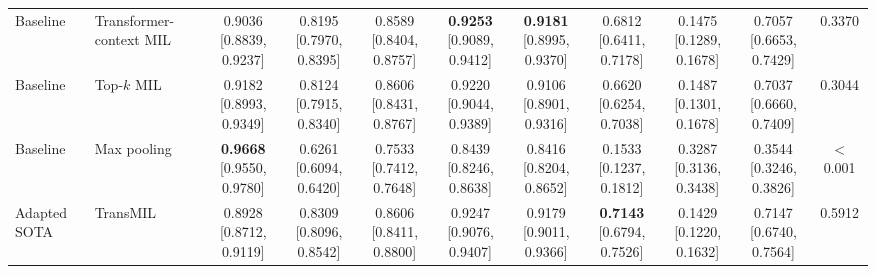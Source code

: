 \documentclass[Afour,sagev,times]{sagej}
\begin{document}
\begin{table}[t]
{\begin{tabular}{ll*{9}{c}}
Baseline & Transformer-context MIL & \shortstack{0.9036\\{[}0.8839, 0.9237{]}} & \shortstack{0.8195\\{[}0.7970, 0.8395{]}} & \shortstack{0.8589\\{[}0.8404, 0.8757{]}} & \shortstack{\textbf{0.9253}\\{[}0.9089, 0.9412{]}} & \shortstack{\textbf{0.9181}\\{[}0.8995, 0.9370{]}} & \shortstack{0.6812\\{[}0.6411, 0.7178{]}} & \shortstack{0.1475\\{[}0.1289, 0.1678{]}} & \shortstack{0.7057\\{[}0.6653, 0.7429{]}} & 0.3370 \\
Baseline & Top-$k$ MIL & \shortstack{0.9182\\{[}0.8993, 0.9349{]}} & \shortstack{0.8124\\{[}0.7915, 0.8340{]}} & \shortstack{0.8606\\{[}0.8431, 0.8767{]}} & \shortstack{0.9220\\{[}0.9044, 0.9389{]}} & \shortstack{0.9106\\{[}0.8901, 0.9316{]}} & \shortstack{0.6620\\{[}0.6254, 0.7038{]}} & \shortstack{0.1487\\{[}0.1301, 0.1678{]}} & \shortstack{0.7037\\{[}0.6660, 0.7409{]}} & 0.3044 \\
Baseline & Max pooling & \shortstack{\textbf{0.9668}\\{[}0.9550, 0.9780{]}} & \shortstack{0.6261\\{[}0.6094, 0.6420{]}} & \shortstack{0.7533\\{[}0.7412, 0.7648{]}} & \shortstack{0.8439\\{[}0.8246, 0.8638{]}} & \shortstack{0.8416\\{[}0.8204, 0.8652{]}} & \shortstack{0.1533\\{[}0.1237, 0.1812{]}} & \shortstack{0.3287\\{[}0.3136, 0.3438{]}} & \shortstack{0.3544\\{[}0.3246, 0.3826{]}} & $<$0.001 \\
\midrule
Adapted SOTA & TransMIL & \shortstack{0.8928\\{[}0.8712, 0.9119{]}} & \shortstack{0.8309\\{[}0.8096, 0.8542{]}} & \shortstack{0.8606\\{[}0.8411, 0.8800{]}} & \shortstack{0.9247\\{[}0.9076, 0.9407{]}} & \shortstack{0.9179\\{[}0.9011, 0.9366{]}} & \shortstack{\textbf{0.7143}\\{[}0.6794, 0.7526{]}} & \shortstack{0.1429\\{[}0.1220, 0.1632{]}} & \shortstack{0.7147\\{[}0.6740, 0.7564{]}} & 0.5912 \\

\end{tabular}}
\end{table}
\end{document}
